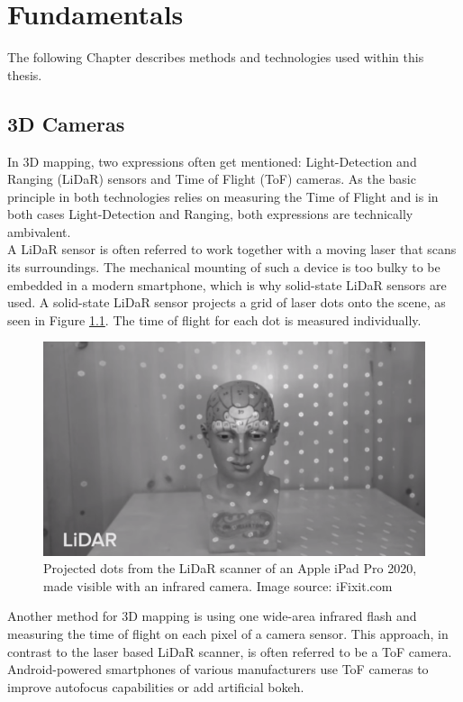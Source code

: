 \chapter{Fundamentals}
\label{sec:Fundamentals}
The following Chapter describes methods and technologies used within this thesis.
\section{3D Cameras}
\label{sec:ToFCamera}
In 3D mapping, two expressions often get mentioned: Light-Detection and Ranging (LiDaR) sensors and Time of Flight (ToF) cameras. As the basic principle in both technologies relies on measuring the Time of Flight and is in both cases Light-Detection and Ranging, both expressions are technically ambivalent.\\
A LiDaR sensor is often referred to work together with a moving laser that scans its surroundings.\cite{Techradar_Lidar} The mechanical mounting of such a device is too bulky to be embedded in a modern smartphone, which is why solid-state LiDaR sensors are used. A solid-state LiDaR sensor projects a grid of laser dots onto the scene, as seen in Figure \ref{im:iPadLidar}. The time of flight for each dot is measured individually.
\begin{figure}[H]
    \centering
    \includegraphics[width=1.0\textwidth]{images/ifixit_lidar.png}
    \caption{Projected dots from the LiDaR scanner of an Apple iPad Pro 2020, made visible with an infrared camera. Image source: iFixit.com}
    \label{im:iPadLidar}
\end{figure}
Another method for 3D mapping is using one wide-area infrared flash and measuring the time of flight on each pixel of a camera sensor. This approach, in contrast to the laser based LiDaR scanner, is often referred to be a ToF camera. Android-powered smartphones of various manufacturers use ToF cameras to improve autofocus capabilities or add artificial bokeh.\\
